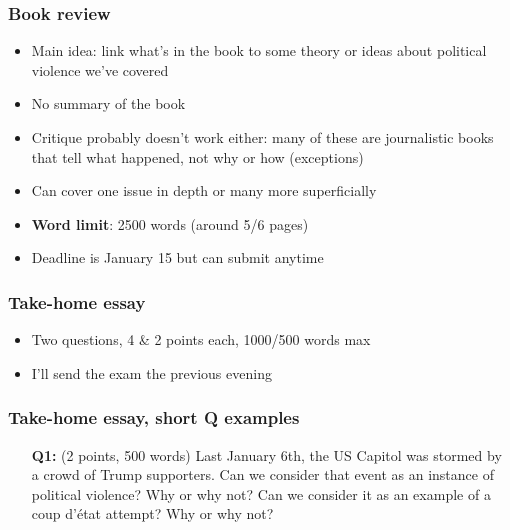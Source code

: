 \documentclass[aspectratio=43]{beamer}
\begin{document}
\begin{frame}
\frametitle{\textbf{Book review}}
\centering

\begin{itemize}
  \item Main idea: link what's in the book to some theory or ideas about political violence we've covered
  \item No summary of the book
  \item Critique probably doesn't work either: many of these are journalistic books that tell what happened, not why or how (exceptions)
  \item Can cover one issue in depth or many more superficially
  \item \textbf{Word limit}: 2500 words (around 5/6 pages)
  \item Deadline is January 15 but can submit anytime
\end{itemize}

\end{frame}


\begin{frame}
\frametitle{\textbf{Take-home essay}}
\centering

\begin{itemize}
  \item Two questions, 4 \& 2 points each, 1000/500 words max
  \item I'll send the exam the previous evening
\end{itemize}

\end{frame}

\begin{frame}
\frametitle{Take-home essay, short Q examples}
\centering

\begin{itemize}
  \item[\textbf{Q1:}] (2 points, 500 words) Last January 6th, the US Capitol was stormed by a crowd of Trump supporters. Can we consider that event as an instance of political violence? Why or why not? Can we consider it as an example of a coup d'état attempt? Why or why not?
\end{itemize}

\end{frame}
\end{document}
